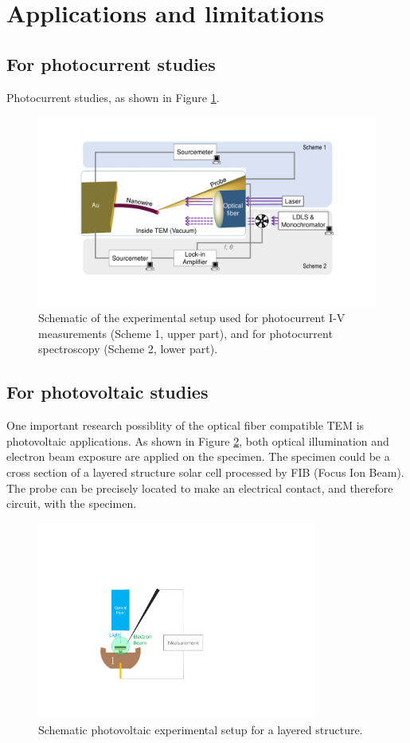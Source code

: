 \section{Applications and limitations}
\subsection{For photocurrent studies}
Photocurrent studies, as shown in Figure \ref{fig:6_1}. 

\begin{figure}  
\includegraphics[width=\textwidth]{figures/figure6_1}
\caption[Two experimental scheme]
{Schematic of the experimental setup used for photocurrent I-V measurements (Scheme 1, upper part), and for photocurrent spectroscopy (Scheme 2, lower part).
\label{fig:6_1}}
\end{figure}


\subsection{For photovoltaic studies}
One important research possiblity of the optical fiber compatible TEM is photovoltaic applications. 
As shown in Figure \ref{fig:2_sc}, both optical illumination and electron beam exposure are applied on the specimen. The specimen could be a cross section of a layered structure solar cell processed by FIB (Focus Ion Beam). The probe can be precisely located to make an electrical contact, and therefore circuit, with the specimen. 
\begin{figure}  
\centering
\includegraphics[width=260pt,angle=-90]{figures/figure2_sc}
\caption[Photovoltaic research inside TEM.]{Schematic photovoltaic experimental setup for a layered structure.
\label{fig:2_sc}}
\end{figure}
